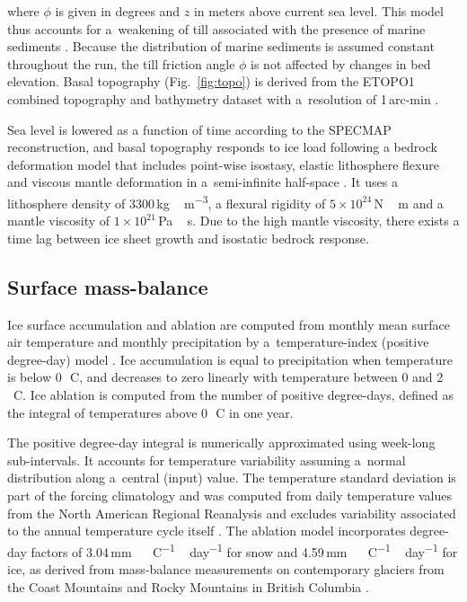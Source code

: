\documentclass[tc, ms]{copernicus}
\begin{document}
where $\phi$ is given in degrees and $z$ in meters above current sea level.
This model thus accounts for a~weakening of till associated with the presence
of marine sediments \citep{martin-etal-2011,aschwanden-etal-2013}. Because the
distribution of marine sediments is assumed constant throughout the run, the
till friction angle $\phi$ is not affected by changes in bed elevation. Basal
topography (Fig.~\ref{fig:topo}) is derived from the ETOPO1 combined topography
and bathymetry dataset with a~resolution of 1\,arc-min \citep{data:etopo1}.

Sea level is lowered as a function of time according to the SPECMAP
reconstruction, and basal topography responds to ice load
following a bedrock deformation model that includes point-wise isostasy,
elastic lithosphere flexure and viscous mantle deformation in a~semi-infinite
half-space \citep{lingle-clark-1985,bueler-etal-2007}. It uses a lithosphere
density of 3300\,\unit{kg\,m^{-3}}, a flexural rigidity of $5 \times
10^{24}$\,\unit{N\,m} and a mantle viscosity of $1 \times
10^{21}$\,\unit{Pa\,s}. Due to the high mantle viscosity, there exists a time
lag between ice sheet growth and isostatic bedrock response.

\subsection{Surface mass-balance}

Ice surface accumulation and ablation are computed from monthly mean surface
air temperature and monthly precipitation by a~temperature-index (positive
degree-day) model \citep{hock-2003}. Ice accumulation is equal to precipitation
when temperature is below 0\,\unit{{\degree}C}, and decreases to zero linearly
with temperature between 0 and 2\,\unit{{\degree}C}. Ice ablation is computed
from the number of positive degree-days, defined as the integral of
temperatures above 0\,\unit{{\degree}C} in one year.

The positive degree-day integral \citep{calov-greve-2005} is numerically
approximated using week-long sub-intervals. It accounts for temperature
variability assuming a~normal distribution along a~central (input) value. The
temperature standard deviation is part of the forcing climatology and was
computed from daily temperature values from the North American Regional
Reanalysis \citep{data:narr} and excludes variability associated to the annual
temperature cycle itself \citet{seguinot-rogozhina-2014}. The
ablation model incorporates degree-day factors of
3.04\,\unit{mm\,{\degree}C^{-1}\,day^{-1}} for snow and
4.59\,\unit{mm\,{\degree}C^{-1}\,day^{-1}} for ice, as derived from
mass-balance measurements on contemporary glaciers from the Coast Mountains and
Rocky Mountains in British Columbia \citep{shea-etal-2009}.
\end{document}
